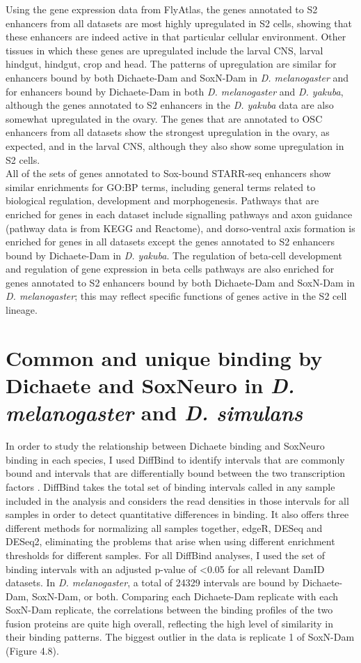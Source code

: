 Using the gene expression data from FlyAtlas, the genes annotated to S2 enhancers from all datasets are most highly upregulated in S2 cells, showing that these enhancers are indeed active in that particular cellular environment. Other tissues in which these genes are upregulated include the larval CNS, larval hindgut, hindgut, crop and head. The patterns of upregulation are similar for enhancers bound by both Dichaete-Dam and SoxN-Dam in \emph{D. melanogaster} and for enhancers bound by Dichaete-Dam in both \emph{D. melanogaster} and \emph{D. yakuba}, although the genes annotated to S2 enhancers in the \emph{D. yakuba} data are also somewhat upregulated in the ovary. The genes that are annotated to OSC enhancers from all datasets show the strongest upregulation in the ovary, as expected, and in the larval CNS, although they also show some upregulation in S2 cells.\\

All of the sets of genes annotated to Sox-bound STARR-seq enhancers show similar enrichments for GO:BP terms, including general terms related to biological regulation, development and morphogenesis. Pathways that are enriched for genes in each dataset include signalling pathways and axon guidance (pathway data is from KEGG and Reactome), and dorso-ventral axis formation is enriched for genes in all datasets except the genes annotated to S2 enhancers bound by Dichaete-Dam in \emph{D. yakuba}. The regulation of beta-cell development and regulation of gene expression in beta cells pathways are also enriched for genes annotated to S2 enhancers bound by both Dichaete-Dam and SoxN-Dam in \emph{D. melanogaster}; this may reflect specific functions of genes active in the S2 cell lineage.

\section{Common and unique binding by Dichaete and SoxNeuro in \emph{D. melanogaster} and \emph{D. simulans}}
In order to study the relationship between Dichaete binding and SoxNeuro binding in each species, I used DiffBind to identify intervals that are commonly bound and intervals that are differentially bound between the two transcription factors \citep{ross-innes_differential_2012}. DiffBind takes the total set of binding intervals called in any sample included in the analysis and considers the read densities in those intervals for all samples in order to detect quantitative differences in binding. It also offers three different methods for normalizing all samples together, edgeR, DESeq and DESeq2, eliminating the problems that arise when using different enrichment thresholds for different samples. For all DiffBind analyses, I used the set of binding intervals with an adjusted p-value of \textless 0.05 for all relevant DamID datasets. In \emph{D. melanogaster}, a total of 24329 intervals are bound by Dichaete-Dam, SoxN-Dam, or both. Comparing each Dichaete-Dam replicate with each SoxN-Dam replicate, the correlations between the binding profiles of the two fusion proteins are quite high overall, reflecting the high level of similarity in their binding patterns. The biggest outlier in the data is replicate 1 of SoxN-Dam (Figure 4.8).

